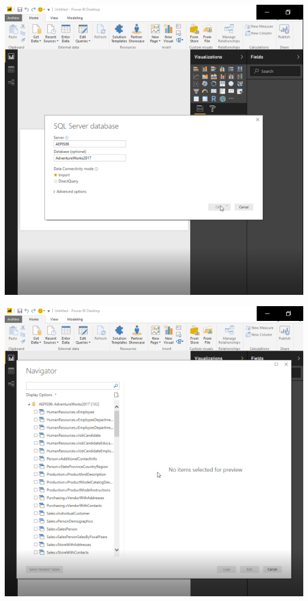 	\begin{center}
	\includegraphics[width=17cm]{./Imagenes/3}
	\end{center}

	\begin{center}
	\includegraphics[width=17cm]{./Imagenes/5}
	\end{center}